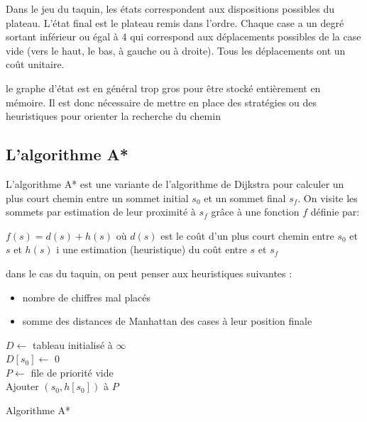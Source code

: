 \begin{example}
	Dans le jeu du taquin, les états correspondent aux dispositions possibles du plateau. L'état final est le plateau remis dans l'ordre. Chaque case a un degré sortant inférieur ou égal à 4 qui correspond aux déplacements possibles de la case vide (vers le haut, le bas, à gauche ou à droite). Tous les déplacements ont un coût unitaire.
\end{example}

\begin{rem}
	le graphe d'état est en général trop gros pour être stocké entièrement en mémoire. Il est donc nécessaire de mettre en place des stratégies ou des heuristiques pour orienter la recherche du chemin
\end{rem}

\subsection{L'algorithme A*}

\begin{principe}
	L'algorithme A* est une variante de l'algorithme de Dijkstra pour calculer un plus court chemin entre un sommet initial $s_0$ et un sommet final $s_f$. On visite les sommets par estimation de leur proximité à $s_f$ grâce à une fonction $f$ définie par:
	
	$f(s) = d(s) + h(s)$ où $d(s)$ est le coût d'un plus court chemin entre $s_0$ et $s$ et $h(s)$ i une estimation (heuristique) du coût entre $s$ et $s_f$
\end{principe}

\begin{example}
	dans le cas du taquin, on peut penser aux heuristiques suivantes :
	\begin{itemize}[label=$\bullet$]
		\item nombre de chiffres mal placés 
		\item somme des distances de Manhattan des cases à leur position finale
	\end{itemize}
\end{example}

\begin{algorithm}[H]
	
	$D \gets$ tableau initialisé à $\infty$\\
	$D[s_{0}] \gets$ 0\\
	$P \gets$ file de priorité vide\\
	Ajouter $(s_{0}, h[s_{0}])$ à $P$\\
	\caption{Algorithme A*}
\end{algorithm}

